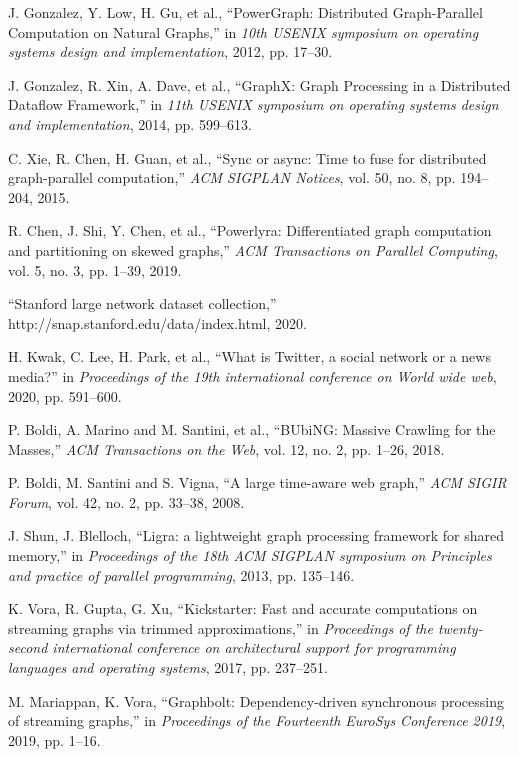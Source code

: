 \documentclass[lettersize,journal]{IEEEtran}
\begin{document}
\begin{thebibliography}{100}
J. Gonzalez, Y. Low, H. Gu, et al., ``{PowerGraph}: Distributed {Graph-Parallel} Computation on Natural Graphs,'' in \textit{10th USENIX symposium on operating systems design and implementation}, 2012, pp. 17--30.

J. Gonzalez, R. Xin, A. Dave, et al., ``{GraphX}: Graph Processing in a Distributed Dataflow Framework,'' in \textit{11th USENIX symposium on operating systems design and implementation}, 2014, pp. 599--613.

C. Xie, R. Chen, H. Guan, et al., ``Sync or async: Time to fuse for distributed graph-parallel computation,'' \textit{ACM SIGPLAN Notices}, vol. 50, no. 8, pp. 194--204, 2015.

R. Chen, J. Shi, Y. Chen, et al., ``Powerlyra: Differentiated graph computation and partitioning on skewed graphs,'' \textit{ACM Transactions on Parallel Computing}, vol. 5, no. 3, pp. 1--39, 2019.

``Stanford large network dataset collection,'' http://snap.stanford.edu/data/index.html, 2020.

H. Kwak, C. Lee, H. Park, et al., ``What is Twitter, a social network or a news media?'' in \textit{Proceedings of the 19th international conference on World wide web}, 2020, pp. 591--600.

P. Boldi, A. Marino and M. Santini, et al.,  ``BUbiNG: Massive Crawling for the Masses,''  \textit{ACM Transactions on the Web}, vol. 12, no. 2, pp. 1--26, 2018.

P. Boldi, M. Santini and S. Vigna,  ``A large time-aware web graph,''  \textit{ACM SIGIR Forum}, vol. 42, no. 2, pp. 33--38, 2008.

J. Shun, J. Blelloch, ``Ligra: a lightweight graph processing framework for shared memory,'' in \textit{Proceedings of the 18th ACM SIGPLAN symposium on Principles and practice of parallel programming}, 2013, pp. 135--146.

K. Vora, R. Gupta, G. Xu, ``Kickstarter: Fast and accurate computations on streaming graphs via trimmed approximations,'' in \textit{Proceedings of the twenty-second international conference on architectural support for programming languages and operating systems}, 2017, pp. 237--251.

M. Mariappan, K. Vora, ``Graphbolt: Dependency-driven synchronous processing of streaming graphs,'' in \textit{Proceedings of the Fourteenth EuroSys Conference 2019}, 2019, pp. 1--16.


\end{thebibliography}
\end{document}
